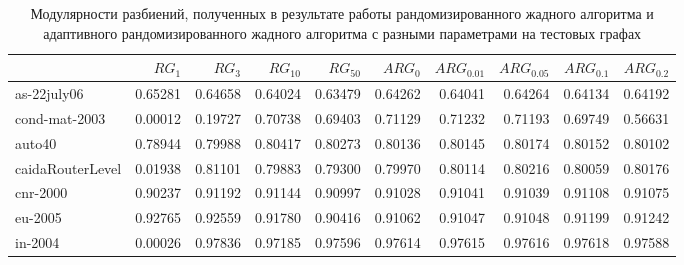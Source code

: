 \begin{table}[H]
	\caption{Модулярности разбиений, полученных в результате работы рандомизированного жадного алгоритма и адаптивного рандомизированного жадного алгоритма с разными параметрами на тестовых графах}
 	\label{tab:arg-res-q}
 	{\scriptsize
 	\begin{tabularx}{\textwidth}{Xrrrrrrrrr}\hline
 						& $RG_1$	& $RG_3$	& $RG_{10}$	& $RG_{50}$	& $ARG_0$	&$ARG_{0.01}$	&$ARG_{0.05}$	& $ARG_{0.1}$	& $ARG_{0.2}$	\\\hline
 	as-22july06			& 0.65281	& 0.64658	& 0.64024	& 0.63479	& 0.64262	& 0.64041	& 0.64264	& 0.64134	& 0.64192	\\
 	cond-mat-2003		& 0.00012	& 0.19727	& 0.70738	& 0.69403	& 0.71129	& 0.71232	& 0.71193	& 0.69749	& 0.56631	\\
 	auto40			 	& 0.78944	& 0.79988	& 0.80417	& 0.80273	& 0.80136	& 0.80145	& 0.80174	& 0.80152	& 0.80102	\\
 	caidaRouterLevel 	& 0.01938	& 0.81101	& 0.79883	& 0.79300	& 0.79970	& 0.80114	& 0.80216	& 0.80059	& 0.80176	\\
 	cnr-2000			& 0.90237	& 0.91192	& 0.91144	& 0.90997	& 0.91028	& 0.91041	& 0.91039	& 0.91108	& 0.91075	\\
 	eu-2005				& 0.92765	& 0.92559	& 0.91780	& 0.90416	& 0.91062	& 0.91047	& 0.91048	& 0.91199	& 0.91242	\\
 	in-2004				& 0.00026	& 0.97836	& 0.97185	& 0.97596	& 0.97614	& 0.97615	& 0.97616	& 0.97618	& 0.97588	\\\hline
 	\end{tabularx}
 	}
\end{table}

